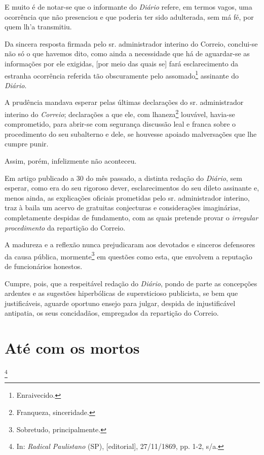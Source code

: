 E muito é de notar-se que o informante do \emph{Diário} refere, em
termos vagos, uma ocorrência que não presenciou e que poderia ter sido
adulterada, sem má fé, por quem lh'a transmitiu.

Da sincera resposta firmada pelo sr. administrador interino do Correio,
conclui-se não só o que havemos dito, como ainda a necessidade que há de
aguardar-se as informações por ele exigidas, {[}por meio das quais se{]}
fará esclarecimento da estranha ocorrência referida tão obscuramente
pelo assomado\footnote{Enraivecido.} assinante do \emph{Diário}.

A prudência mandava esperar pelas últimas declarações do sr.
administrador interino do \emph{Correio}; declarações a que ele, com
lhaneza\footnote{Franqueza, sinceridade.} louvável, havia-se
comprometido, para abrir-se com segurança discussão leal e franca sobre
o procedimento do seu subalterno e dele, se houvesse apoiado
malversações que lhe cumpre punir.

Assim, porém, infelizmente não aconteceu.

Em artigo publicado a 30 do mês passado, a distinta redação do
\emph{Diário}, sem esperar, como era do seu rigoroso dever,
esclarecimentos do seu dileto assinante e, menos ainda, as explicações
oficiais prometidas pelo sr. administrador interino, traz à baila um
acervo de gratuitas conjecturas e considerações imaginárias,
completamente despidas de fundamento, com as quais pretende provar o
\emph{irregular procedimento} da repartição do Correio.

A madureza e a reflexão nunca prejudicaram aos devotados e sinceros
defensores da causa pública, mormente\footnote{Sobretudo,
  principalmente.} em questões como esta, que envolvem a reputação de
funcionários honestos.

Cumpre, pois, que a respeitável redação do \emph{Diário}, pondo de parte
as concepções ardentes e as sugestões hiperbólicas de supersticioso
publicista, se bem que justificáveis, aguarde oportuno ensejo para
julgar, despida de injustificável antipatia, os seus concidadãos,
empregados da repartição do Correio.

\chapter{Até com os mortos}\footnote{In: \emph{Radical Paulistano} (SP),
  {[}editorial{]}, 27/11/1869, pp. 1-2, s/a.}

